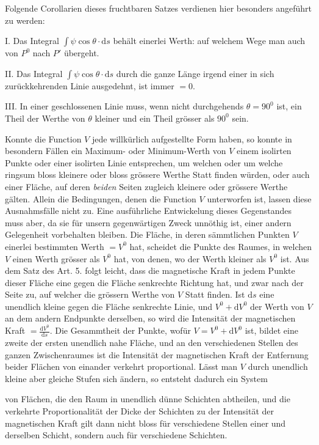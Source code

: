 Folgende Corollarien dieses fruchtbaren Satzes verdienen hier besonders angeführt zu werden:

I. Das Integral $\int\psi\cos\theta\cdot\mathrm{d}s$ behält einerlei Werth: auf welchem Wege man auch von $P^0$ nach $P'$ übergeht.

II. Das Integral $\int\psi\cos\theta\cdot\mathrm{d}s$ durch die ganze Länge irgend einer in sich zurückkehrenden Linie ausgedehnt, ist immer $=0$.

III. In einer geschlossenen Linie muss, wenn nicht durchgehends $\theta=90^0$ ist, ein Theil der Werthe von $\theta$ kleiner und ein Theil grösser als $90^0$ sein.

\expandafter\def\csname HistoricalNoteText15\endcsname{Konnte die Function $V$ jede willkürlich aufgestellte Form haben, so konnte in besondern Fällen ein Maximum- oder Minimum-Werth von $V$ einem isolirten Punkte oder einer isolirten Linie entsprechen, um welchen oder um welche ringsum bloss kleinere oder bloss grössere Werthe Statt finden würden, oder auch einer Fläche, auf deren \textit{beiden} Seiten zugleich kleinere oder grössere Werthe gälten. Allein die Bedingungen, denen die Function $V$ unterworfen ist, lassen diese Ausnahmsfälle nicht zu. Eine ausführliche Entwickelung dieses Gegenstandes muss aber, da sie für unsern gegenwärtigen Zweck unnöthig ist, einer andern Gelegenheit vorbehalten bleiben.}
Die Fläche, in deren sämmtlichen Punkten $V$ einerlei bestimmten Werth $=V^0$ hat, scheidet die Punkte des Raumes, in welchen $V$ einen Werth grösser als $V^0$ hat, von denen, wo der Werth kleiner als $V^0$ ist. Aus dem Satz des Art. 5. folgt leicht, dass die magnetische Kraft in jedem Punkte dieser Fläche eine gegen die Fläche senkrechte Richtung hat, und zwar nach der Seite zu, auf welcher die grössern Werthe von $V$ Statt finden. Ist $\mathrm{d}s$ eine unendlich kleine gegen die Fläche senkrechte Linie, und $V^0+\mathrm{d}V^0$ der Werth von $V$ an dem andern Endpunkte derselben, so wird die Intensität der magnetischen Kraft $=\frac{\mathrm{d}V^0}{\mathrm{d}s}$. Die Gesammtheit der Punkte, wofür $V=V^0+\mathrm{d}V^0$ ist, bildet eine zweite der ersten unendlich nahe Fläche, und an den verschiedenen Stellen des ganzen Zwischenraumes ist die Intensität der magnetischen Kraft der Entfernung beider Flächen von einander verkehrt proportional. Lässt man $V$ durch unendlich kleine aber gleiche Stufen sich ändern, so entsteht dadurch ein System
\par{}
\par\clearpage
{}
\noindent von Flächen, die den Raum in unendlich dünne Schichten abtheilen, und die verkehrte Proportionalität der Dicke der Schichten zu der Intensität der magnetischen Kraft gilt dann nicht bloss für verschiedene Stellen einer und derselben Schicht, sondern auch für verschiedene Schichten.

